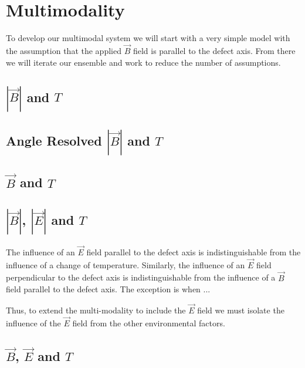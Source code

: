\section{Multimodality}
To develop our multimodal system we will start with a very simple model with the assumption that the applied $\vec{B}$ field is parallel to the defect axis. From there we will iterate our ensemble and work to reduce the number of assumptions.  


\subsection{$|\vec{B}|$ and $T$}
\cite{Degen2008}

\subsection{Angle Resolved $|\vec{B}|$ and $T$}
\cite{PhysRevApplied.4.014009}

\subsection{$\vec{B}$ and $T$}


\subsection{$|\vec{B}|$, $|\vec{E}|$ and $T$}
The influence of an $\vec{E}$ field parallel to the defect axis is indistinguishable from the influence of a change of temperature. Similarly, the influence of an $\vec{E}$ field perpendicular to the defect axis is indistinguishable from the influence of a $\vec{B}$ field parallel to the defect axis. The exception is when ... 

\begin{figure}[h]
    \begin{center}
    \end{center}
    \caption{}\label{fig:}
\end{figure}


Thus, to extend the multi-modality to include the $\vec{E}$ field we must isolate the influence of the $\vec{E}$ field from the other environmental factors. 



\subsection{$\vec{B}$, $\vec{E}$ and $T$}

